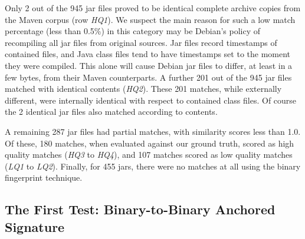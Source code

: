 Only 2 out of the 945 jar files proved to be identical complete archive
copies from the Maven corpus (row \emph{HQ1}).  We suspect the main reason
for such a low match percentage (less than 0.5\%) in this category may be
Debian's policy of recompiling all jar files from original sources.  Jar
files record timestamps of contained files, and Java class files tend to
have timestamps set to the moment they were compiled.  This alone will
cause Debian jar files to differ, at least in a few bytes, from their Maven
counterparts.  A further 201 out of the 945 jar files matched with
identical contents (\emph{HQ2}).  These 201 matches, while externally
different, were internally identical with respect to contained class files.
Of course the 2 identical jar files also matched according to contents.

A remaining 287 jar files had partial matches, with similarity scores less
than 1.0.  Of these, 180 matches, when evaluated against our ground truth,
scored as high quality matches (\emph{HQ3} to \emph{HQ4}), and 107 matches
scored as low quality matches (\emph{LQ1} to \emph{LQ2}).  Finally, for 455
jars, there were no matches at all using the binary fingerprint technique.


\subsection{The First Test: Binary-to-Binary Anchored Signature}

